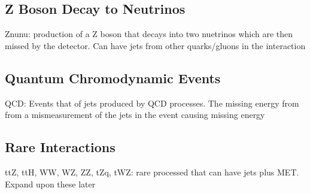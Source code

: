 \subsection{Z Boson Decay to Neutrinos}
\label{subsec:Znunu}

Znunu: production of a Z boson that decays into two nuetrinos which are then missed by the detector. Can have jets from other quarks/gluons in the interaction

\subsection{Quantum Chromodynamic Events}
\label{subsec:QCD}

QCD: Events that of jets produced by QCD processes. The missing energy from from a mismeasurement of the jets in the event causing missing energy

\subsection{Rare Interactions}
\label{subsec:rare}

ttZ, ttH, WW, WZ, ZZ, tZq, tWZ: rare processed that can have jets plus MET. Expand upon these later
